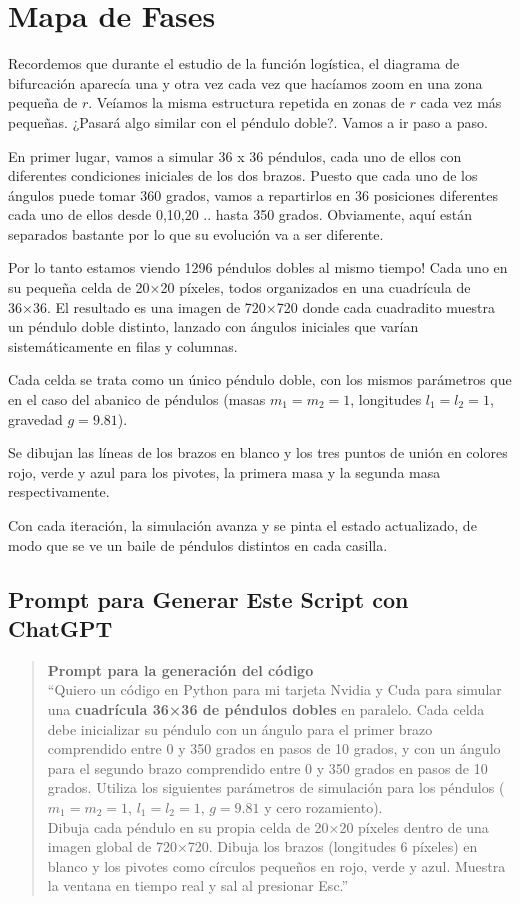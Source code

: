 \documentclass[
  10pt,
  a4paper,
  DIV=11,
  numbers=noendperiod,
  open=any]{scrreprt}
\numberwithin{equation}{chapter}
\numberwithin{equation}{section}
\renewcommand{\[}{\begin{equation}}
\renewcommand{\]}{\end{equation}}
\begin{document}
\chapter{Mapa de Fases}\label{mapa-de-fases}

Recordemos que durante el estudio de la función logística, el diagrama
de bifurcación aparecía una y otra vez cada vez que hacíamos zoom en una
zona pequeña de \(r\). Veíamos la misma estructura repetida en zonas de
\(r\) cada vez más pequeñas. ¿Pasará algo similar con el péndulo doble?.
Vamos a ir paso a paso.

En primer lugar, vamos a simular 36 x 36 péndulos, cada uno de ellos con
diferentes condiciones iniciales de los dos brazos. Puesto que cada uno
de los ángulos puede tomar 360 grados, vamos a repartirlos en 36
posiciones diferentes cada uno de ellos desde 0,10,20 .. hasta 350
grados. Obviamente, aquí están separados bastante por lo que su
evolución va a ser diferente.

Por lo tanto estamos viendo 1296 péndulos dobles al mismo tiempo! Cada
uno en su pequeña celda de 20×20 píxeles, todos organizados en una
cuadrícula de 36×36. El resultado es una imagen de 720×720 donde cada
cuadradito muestra un péndulo doble distinto, lanzado con ángulos
iniciales que varían sistemáticamente en filas y columnas.

Cada celda se trata como un único péndulo doble, con los mismos
parámetros que en el caso del abanico de péndulos (masas \(m_1=m_2=1\),
longitudes \(l_1=l_2=1\), gravedad \(g=9.81\)).

Se dibujan las líneas de los brazos en blanco y los tres puntos de unión
en colores rojo, verde y azul para los pivotes, la primera masa y la
segunda masa respectivamente.

Con cada iteración, la simulación avanza y se pinta el estado
actualizado, de modo que se ve un baile de péndulos distintos en cada
casilla.

\section{Prompt para Generar Este Script con
ChatGPT}\label{prompt-para-generar-este-script-con-chatgpt}

\begin{quote}
\textbf{Prompt para la generación del código}\\
``Quiero un código en Python para mi tarjeta Nvidia y Cuda para simular
una \textbf{cuadrícula 36×36 de péndulos dobles} en paralelo. Cada celda
debe inicializar su péndulo con un ángulo para el primer brazo
comprendido entre 0 y 350 grados en pasos de 10 grados, y con un ángulo
para el segundo brazo comprendido entre 0 y 350 grados en pasos de 10
grados. Utiliza los siguientes parámetros de simulación para los
péndulos (\(m_1 = m_2 = 1\), \(l_1 = l_2 = 1\), \(g = 9.81\) y cero
rozamiento).\\
Dibuja cada péndulo en su propia celda de 20×20 píxeles dentro de una
imagen global de 720×720. Dibuja los brazos (longitudes 6 píxeles) en
blanco y los pivotes como círculos pequeños en rojo, verde y azul.
Muestra la ventana en tiempo real y sal al presionar Esc.''
\end{quote}
\end{document}
